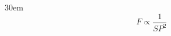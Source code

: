 \documentclass[border=4pt]{standalone}
\begin{document}
\begin{varwidth}{30em}
\large
\[ F \propto \dfrac{1}{SP^2} \]

\end{varwidth}
\end{document}
